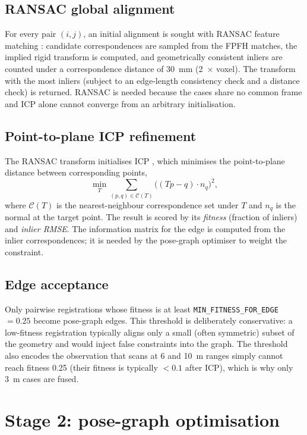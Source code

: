 \subsection{RANSAC global alignment}
For every pair $(i,j)$, an initial alignment is sought with RANSAC feature
matching \citep{fischler1981ransac}: candidate correspondences are sampled from
the FPFH matches, the implied rigid transform is computed, and geometrically
consistent inliers are counted under a correspondence distance of 30~mm
(2~$\times$ voxel). The transform with the most inliers (subject to an
edge-length consistency check and a distance check) is returned. RANSAC is
needed because the \suop{} cases share no common frame and ICP alone cannot
converge from an arbitrary initialisation.

\subsection{Point-to-plane ICP refinement}
The RANSAC transform initialises ICP \citep{besl1992method}, which minimises
the point-to-plane distance between corresponding points,
\begin{equation}
\label{eq:icp}
\min_{T} \sum_{(p,q)\in \mathcal{C}(T)}
\big( (T p - q)\cdot n_q \big)^2,
\end{equation}
where $\mathcal{C}(T)$ is the nearest-neighbour correspondence set under $T$ and
$n_q$ is the normal at the target point. The result is scored by its
\emph{fitness} (fraction of inliers) and \emph{inlier RMSE}. The information
matrix for the edge is computed from the inlier correspondences; it is needed
by the pose-graph optimiser to weight the constraint.

\subsection{Edge acceptance}
Only pairwise registrations whose fitness is at least
\texttt{MIN\_FITNESS\_FOR\_EDGE} $= 0.25$ become pose-graph edges. This
threshold is deliberately conservative: a low-fitness registration typically
aligns only a small (often symmetric) subset of the geometry and would inject
false constraints into the graph. The threshold also encodes the observation
that \suop{} scans at 6 and 10~m ranges simply cannot reach fitness 0.25 (their
fitness is typically $<0.1$ after ICP), which is why only 3~m cases are fused.

\section{Stage 2: pose-graph optimisation}
\label{sec:routea_graph}

